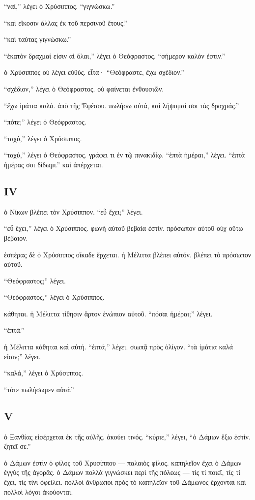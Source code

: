 \documentclass[a4paper]{report}
\begin{document}
``ναί,'' λέγει ὁ Χρύσιππος. ``γιγνώσκω.''

``καὶ εἴκοσιν ἄλλας ἐκ τοῦ περσινοῦ ἔτους.''

``καὶ ταύτας γιγνώσκω.''

``ἑκατὸν δραχμαί εἰσιν αἱ ὅλαι,'' λέγει ὁ Θεόφραστος. ``σήμερον καλόν
ἐστιν.''

ὁ Χρύσιππος οὐ λέγει εὐθύς. εἶτα· ``Θεόφραστε, ἔχω σχέδιον.''

``σχέδιον,'' λέγει ὁ Θεόφραστος. οὐ φαίνεται ἐνθουσιῶν.

``ἔχω ἱμάτια καλά. ἀπὸ τῆς Ἐφέσου. πωλήσω αὐτά, καὶ λήψομαί σοι τὰς
δραχμάς.''

``πότε;'' λέγει ὁ Θεόφραστος.

``ταχύ,'' λέγει ὁ Χρύσιππος.

``ταχύ,'' λέγει ὁ Θεόφραστος. γράφει τι ἐν τῷ πινακιδίῳ. ``ἑπτὰ
ἡμέραι,'' λέγει. ``ἑπτὰ ἡμέρας σοι δίδωμι.'' καὶ ἀπέρχεται.

\subsection{IV}\label{iv-3}

ὁ Νίκων βλέπει τὸν Χρύσιππον. ``εὖ ἔχει;'' λέγει.

``εὖ ἔχει,'' λέγει ὁ Χρύσιππος. φωνὴ αὐτοῦ βεβαία ἐστίν. πρόσωπον αὐτοῦ
οὐχ οὕτω βέβαιον.

ἑσπέρας δὲ ὁ Χρύσιππος οἴκαδε ἔρχεται. ἡ Μέλιττα βλέπει αὐτόν. βλέπει τὸ
πρόσωπον αὐτοῦ.

``Θεόφραστος;'' λέγει.

``Θεόφραστος,'' λέγει ὁ Χρύσιππος.

κάθηται. ἡ Μέλιττα τίθησιν ἄρτον ἐνώπιον αὐτοῦ. ``πόσαι ἡμέραι;'' λέγει.

``ἑπτά.''

ἡ Μέλιττα κάθηται καὶ αὐτή. ``ἑπτά,'' λέγει. σιωπᾷ πρὸς ὀλίγον. ``τὰ
ἱμάτια καλά εἰσιν;'' λέγει.

``καλά,'' λέγει ὁ Χρύσιππος.

``τότε πωλήσωμεν αὐτά.''

\subsection{V}\label{v-4}

ὁ Ξανθίας εἰσέρχεται ἐκ τῆς αὐλῆς. ἀκούει τινός. ``κύριε,'' λέγει, ``ὁ
Δάμων ἔξω ἐστίν. ζητεῖ σε.''

ὁ Δάμων ἐστὶν ὁ φίλος τοῦ Χρυσίππου --- παλαιὸς φίλος. καπηλεῖον ἔχει ὁ
Δάμων ἐγγὺς τῆς ἀγορᾶς. ὁ Δάμων πολλὰ γιγνώσκει περὶ τῆς πόλεως --- τίς
τί ποιεῖ, τίς τί ἔχει, τίς τίνι ὀφείλει. πολλοὶ ἄνθρωποι πρὸς τὸ
καπηλεῖον τοῦ Δάμωνος ἔρχονται καὶ πολλοὶ λόγοι ἀκούονται.
\end{document}
